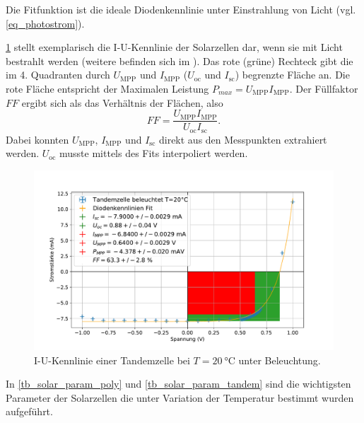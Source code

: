 \documentclass[
	a4paper,
	12pt,
	pagesize,
	ngerman
]{scrartcl}
\begin{document}
	Die Fitfunktion ist die ideale Diodenkennlinie unter Einstrahlung von Licht (vgl. \cref{eq_photostrom}).

	\cref{fig_tandem_beleuchtet_20} stellt exemplarisch die I-U-Kennlinie der Solarzellen dar, wenn sie mit Licht bestrahlt werden (weitere befinden sich im ).
	Das rote (grüne) Rechteck gibt die im 4. Quadranten durch $U_\text{MPP}$ und $I_\text{MPP}$ ($U_\text{oc}$ und $I_\text{sc}$) begrenzte Fläche an.
	Die rote Fläche entspricht der Maximalen Leistung $P_{max} = U_\text{MPP}I_\text{MPP}$.
	Der Füllfaktor $FF$ ergibt sich als das Verhältnis der Flächen, also
	\begin{equation}
		FF = \frac{U_\text{MPP}I_\text{MPP}}{U_\text{oc}I_\text{sc}}.
	\end{equation}
	Dabei konnten $U_\text{MPP}$, $I_\text{MPP}$ und $I_\text{sc}$ direkt aus den Messpunkten extrahiert werden.
	$U_\text{oc}$ musste mittels des Fits interpoliert werden.


	\begin{figure}[H]
			\includegraphics[width=.9\linewidth]{img/Tandemzelle_beleuchtet_20.pdf}
			\caption{
				I-U-Kennlinie einer Tandemzelle bei $T=\SI{20}{\celsius}$ unter Beleuchtung.
								}
			\label{fig_tandem_beleuchtet_20}
	\end{figure}
	In \cref{tb_solar_param_poly} und \cref{tb_solar_param_tandem} sind die wichtigsten Parameter der Solarzellen die unter Variation der Temperatur bestimmt wurden aufgeführt.
\end{document}
